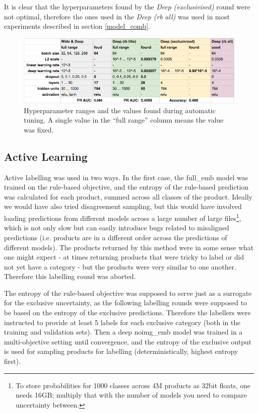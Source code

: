 It is clear that the hyperparameters found by the \textit{Deep (exclusivised)} round were not optimal, therefore the ones used in the \textit{Deep (rb all)} was used in most experiments described in section \ref{model_comb}.

\begin{figure}
  \includegraphics[width=\linewidth]{figures/tuning_rounds}
  \caption{Hyperparameter ranges and the values found during automatic tuning. A single value in the ``full range'' column means the value was fixed.}
  \label{tuning_rounds}
\end{figure}

\subsection{Active Learning}
\label{exp_al}

Active labelling was used in two ways.
In the first case, the full\_emb model was trained on the rule-based objective, and the entropy of the rule-based prediction was calculated for each product, summed across all classes of the product.
Ideally we would have also tried disagreement sampling, but this would have involved loading predictions from different models across a large number of large files\footnote{To store probabilities for 1000 classes across 4M products as 32bit floats, one needs 16GB; multiply that with the number of models you need to compare uncertainty between.}, which is not only slow but can easily introduce bugs related to misaligned predictions (i.e. products are in a different order across the predictions of different models).
The products returned by this method were in some sense what one might expect - at times returning products that were tricky to label or did not yet have a category - but the products were very similar to one another. Therefore this labelling round was aborted.

The entropy of the rule-based objective was supposed to serve just as a surrogate for the exclusive uncertainty, as the following labelling rounds were supposed to be based on the entropy of the exclusive predictions.
Therefore the labellers were instructed to provide at least 5 labels for each exclusive category (both in the training and validation sets).
Then a deep noimg\_emb model was trained in a multi-objective setting until convergence, and the entropy of the exclusive output is used for sampling products for labelling (deterministically, highest entropy first).

